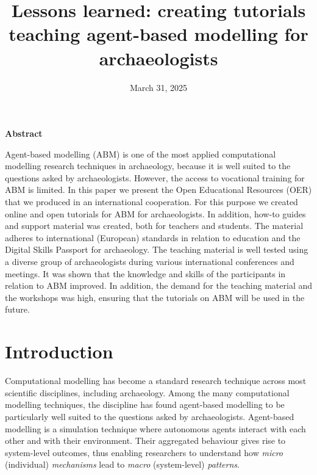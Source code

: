 \documentclass[
]{article}
\title{Lessons learned: creating tutorials teaching agent-based modelling for archaeologists}
\author{}
\date{\vspace{-2.5em}March 31, 2025}
\begin{document}
\maketitle

{
\setcounter{tocdepth}{2}
\tableofcontents
}
\textbf{Abstract}

Agent-based modelling (ABM) is one of the most applied computational modelling research techniques in archaeology, because it is well suited to the questions asked by archaeologists. However, the access to vocational training for ABM is limited. In this paper we present the Open Educational Resources (OER) that we produced in an international cooperation. For this purpose we created online and open tutorials for ABM for archaeologists. In addition, how-to guides and support material was created, both for teachers and students. The material adheres to international (European) standards in relation to education and the Digital Skills Passport for archaeology. The teaching material is well tested using a diverse group of archaeologists during various international conferences and meetings. It was shown that the knowledge and skills of the participants in relation to ABM improved. In addition, the demand for the teaching material and the workshops was high, ensuring that the tutorials on ABM will be used in the future.

\hypertarget{introduction}{%
\section{Introduction}\label{introduction}}

Computational modelling has become a standard research technique across most scientific disciplines, including archaeology. Among the many computational modelling techniques, the discipline has found agent-based modelling to be particularly well suited to the questions asked by archaeologists. Agent-based modelling is a simulation technique where autonomous agents interact with each other and with their environment. Their aggregated behaviour gives rise to system-level outcomes, thus enabling researchers to understand how \emph{micro} (individual) \emph{mechanisms} lead to \emph{macro} (system-level) \emph{patterns}.
\end{document}
